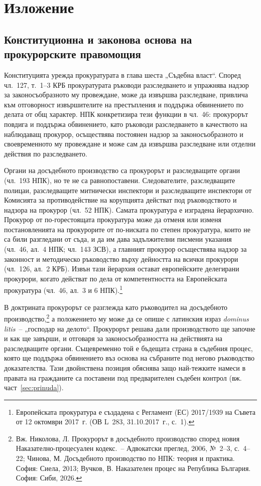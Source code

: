 \section{Изложение}
\label{sec:izlozhenie}

\subsection{Конституционна и законова основа на прокурорските правомощия}
\label{sec:osnova}

Конституцията урежда прокуратурата в глава шеста „Съдебна власт“. Според чл.~127, т.~1--3
КРБ прокуратурата ръководи разследването и упражнява надзор за законосъобразното му
провеждане, може да извършва разследване, привлича към отговорност извършителите на
престъпления и поддържа обвинението по делата от общ характер. НПК конкретизира тези
функции в чл.~46: прокурорът повдига и поддържа обвинението, като ръководи разследването в
качеството на наблюдаващ прокурор, осъществява постоянен надзор за законосъобразното и
своевременното му провеждане и може сам да извършва разследване или отделни действия по
разследването.

Органи на досъдебното производство са прокурорът и разследващите органи (чл.~193 НПК),
но те не са равнопоставени. Следователите, разследващите полицаи, разследващите
митнически инспектори и разследващите инспектори от Комисията за противодействие на
корупцията действат под ръководството и надзора на прокурор (чл.~52 НПК). Самата
прокуратура е изградена йерархично. Прокурор от по-горестоящата прокуратура може да
отменя или изменя постановленията на прокурорите от по-ниската по степен прокуратура,
които не са били разгледани от съда, и да им дава задължителни писмени указания (чл.~46,
ал.~4 НПК; чл.~143 ЗСВ), а главният прокурор осъществява надзор за законност и методическо
ръководство върху дейността на всички прокурори (чл.~126, ал.~2 КРБ). Извън тази йерархия
остават европейските делегирани прокурори, когато действат по дела от компетентността на
Европейската прокуратура (чл.~46, ал.~3 и 6 НПК).\footnote{Европейската прокуратура е
създадена с Регламент (ЕС) 2017/1939 на Съвета от 12 октомври 2017~г. (ОВ L~283,
31.10.2017~г., с.~1).}

В доктрината прокурорът се разглежда като ръководител на досъдебното
производство,\footnote{Вж. Николова, Л. Прокурорът в досъдебното производство според
новия Наказателно-процесуален кодекс.~-- Адвокатски преглед, 2006, №~2--3, с.~4--22;
Чинова, М. Досъдебното производство по НПК: теория и практика. София: Сиела, 2013;
Вучков, В. Наказателен процес на Република България. София: Сиби, 2026.} а положението му
може да се опише с латинския израз \textit{dominus litis}~-- „господар на делото“.
Прокурорът решава дали производството ще започне и как ще завърши, и отговаря за
законосъобразността на действията на разследващите органи. Същевременно той е бъдещата
страна в съдебния процес, която ще поддържа обвинението въз основа на събраните под
негово ръководство доказателства. Тази двойнствена позиция обяснява защо най-тежките
намеси в правата на гражданите са поставени под предварителен съдебен контрол
(вж. част~\ref{sec:prinuda}).

